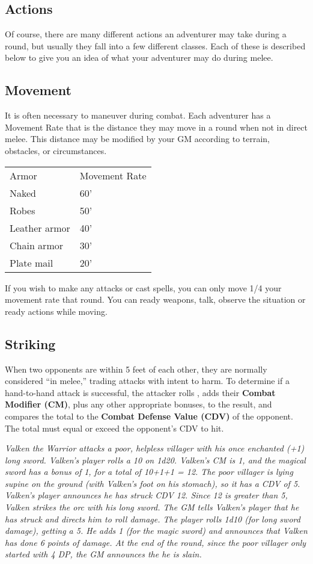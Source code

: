 \begin{multicols*}{2}
\section{Actions}
Of course, there are many different actions an adventurer may take during a round, but usually they fall into a few different classes. Each of these is described below to give you an idea of what your adventurer may do during melee.
\subsection{Movement}
It is often necessary to maneuver during combat. Each adventurer has a Movement Rate that is the distance they may move in a round when not in direct melee. This distance may be modified by your GM according to terrain, obstacles, or circumstances.
\begin{tcolorbox}[breakable,boxrule=0pt,title=\textbf{Armor Movement Restrictions}]
\begin{tabular}{@{}l l}
Armor & Movement Rate\\
Naked & 60'\\
Robes & 50'\\
Leather armor & 40'\\
Chain armor & 30'\\
Plate mail & 20'\\
\end{tabular}
\end{tcolorbox}
If you wish to make any attacks or cast spells, you can only move 1/4 your movement rate that round. You can ready weapons, talk, observe the situation or ready actions while moving.
\subsection{Striking}
When two opponents are within 5 feet of each other, they are normally considered “in melee,” trading attacks with intent to harm. To determine if a hand-to-hand attack is successful, the attacker rolls , adds their \textbf{Combat Modifier (CM)}, plus any other appropriate bonuses, to the result, and compares the total to the \textbf{Combat Defense Value (CDV)} of the opponent. The total must equal or exceed the opponent's CDV to hit.

\textit{Valken the Warrior attacks a poor, helpless villager with his once enchanted (+1) long sword. Valken's player rolls a 10 on 1d20. Valken's CM is 1, and the magical sword has a bonus of 1, for a total of 10+1+1 = 12. The poor villager is lying supine on the ground (with Valken's foot on his stomach), so it has a CDV of 5. Valken's player announces he has struck CDV 12. Since 12 is greater than 5, Valken strikes the orc with his long sword. The GM tells Valken's player that he has struck and directs him to roll damage. The player rolls 1d10 (for long sword damage), getting a 5. He adds 1 (for the magic sword) and announces that Valken has done 6 points of damage. At the end of the round, since the poor villager only started with 4 DP, the GM announces the he is slain.}

\end{multicols*}
